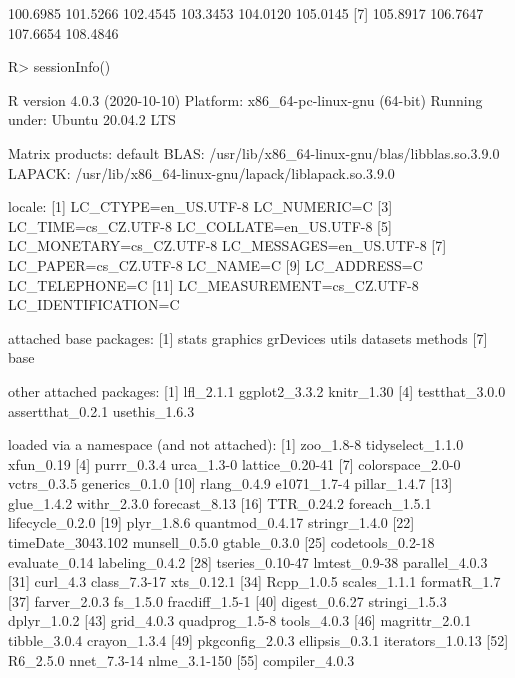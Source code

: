 \documentclass{article}\usepackage[]{graphicx}\usepackage[]{color}
\begin{document}
\begin{Schunk}
% --begin: "frbe"
\begin{Soutput}
 [1] 100.6985 101.5266 102.4545 103.3453 104.0120 105.0145
 [7] 105.8917 106.7647 107.6654 108.4846
\end{Soutput}
%
% --end: "frbe"
\end{Schunk}

\begin{Schunk}
\begin{Sinput}
R> sessionInfo()
\end{Sinput}
\begin{Soutput}
R version 4.0.3 (2020-10-10)
Platform: x86_64-pc-linux-gnu (64-bit)
Running under: Ubuntu 20.04.2 LTS

Matrix products: default
BLAS:   /usr/lib/x86_64-linux-gnu/blas/libblas.so.3.9.0
LAPACK: /usr/lib/x86_64-linux-gnu/lapack/liblapack.so.3.9.0

locale:
 [1] LC_CTYPE=en_US.UTF-8       LC_NUMERIC=C              
 [3] LC_TIME=cs_CZ.UTF-8        LC_COLLATE=en_US.UTF-8    
 [5] LC_MONETARY=cs_CZ.UTF-8    LC_MESSAGES=en_US.UTF-8   
 [7] LC_PAPER=cs_CZ.UTF-8       LC_NAME=C                 
 [9] LC_ADDRESS=C               LC_TELEPHONE=C            
[11] LC_MEASUREMENT=cs_CZ.UTF-8 LC_IDENTIFICATION=C       

attached base packages:
[1] stats     graphics  grDevices utils     datasets  methods  
[7] base     

other attached packages:
[1] lfl_2.1.1        ggplot2_3.3.2    knitr_1.30      
[4] testthat_3.0.0   assertthat_0.2.1 usethis_1.6.3   

loaded via a namespace (and not attached):
 [1] zoo_1.8-8         tidyselect_1.1.0  xfun_0.19        
 [4] purrr_0.3.4       urca_1.3-0        lattice_0.20-41  
 [7] colorspace_2.0-0  vctrs_0.3.5       generics_0.1.0   
[10] rlang_0.4.9       e1071_1.7-4       pillar_1.4.7     
[13] glue_1.4.2        withr_2.3.0       forecast_8.13    
[16] TTR_0.24.2        foreach_1.5.1     lifecycle_0.2.0  
[19] plyr_1.8.6        quantmod_0.4.17   stringr_1.4.0    
[22] timeDate_3043.102 munsell_0.5.0     gtable_0.3.0     
[25] codetools_0.2-18  evaluate_0.14     labeling_0.4.2   
[28] tseries_0.10-47   lmtest_0.9-38     parallel_4.0.3   
[31] curl_4.3          class_7.3-17      xts_0.12.1       
[34] Rcpp_1.0.5        scales_1.1.1      formatR_1.7      
[37] farver_2.0.3      fs_1.5.0          fracdiff_1.5-1   
[40] digest_0.6.27     stringi_1.5.3     dplyr_1.0.2      
[43] grid_4.0.3        quadprog_1.5-8    tools_4.0.3      
[46] magrittr_2.0.1    tibble_3.0.4      crayon_1.3.4     
[49] pkgconfig_2.0.3   ellipsis_0.3.1    iterators_1.0.13 
[52] R6_2.5.0          nnet_7.3-14       nlme_3.1-150     
[55] compiler_4.0.3   
\end{Soutput}
\end{Schunk}
\end{document}
